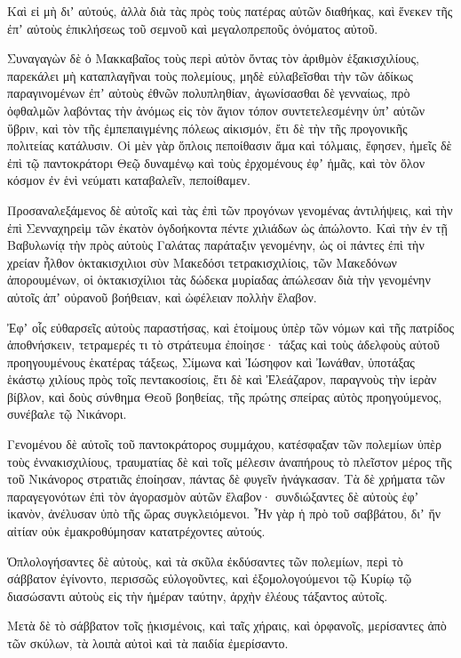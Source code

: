 {Καὶ εἰ μὴ διʼ αὐτούς, ἀλλὰ διὰ τὰς πρὸς τοὺς πατέρας αὐτῶν διαθήκας, καὶ ἕνεκεν τῆς ἐπʼ αὐτοὺς ἐπικλήσεως τοῦ σεμνοῦ καὶ μεγαλοπρεποῦς ὀνόματος αὐτοῦ.
\par }{\PP {}Συναγαγὼν δὲ ὁ Μακκαβαῖος τοὺς περὶ αὐτὸν ὄντας τὸν ἀριθμὸν ἑξακισχιλίους, παρεκάλει μὴ καταπλαγῆναι τοὺς πολεμίους, μηδὲ εὐλαβεῖσθαι τὴν τῶν ἀδίκως παραγινομένων ἐπʼ αὐτοὺς ἐθνῶν πολυπληθίαν, ἀγωνίσασθαι δὲ γενναίως,
πρὸ ὀφθαλμῶν λαβόντας τὴν ἀνόμως εἰς τὸν ἅγιον τόπον συντετελεσμένην ὑπʼ αὐτῶν ὕβριν, καὶ τὸν τῆς ἐμπεπαιγμένης πόλεως αἰκισμόν, ἔτι δὲ τὴν τῆς προγονικῆς πολιτείας κατάλυσιν.
Οἱ μὲν γὰρ ὅπλοις πεποίθασιν ἅμα καὶ τόλμαις, ἔφησεν, ἡμεῖς δὲ ἐπὶ τῷ παντοκράτορι Θεῷ δυναμένῳ καὶ τοὺς ἐρχομένους ἐφʼ ἡμᾶς, καὶ τὸν ὅλον κόσμον ἐν ἑνὶ νεύματι καταβαλεῖν, πεποίθαμεν.
\par }{\PP {}Προσαναλεξάμενος δὲ αὐτοῖς καὶ τὰς ἐπὶ τῶν προγόνων γενομένας ἀντιλήψεις, καὶ τὴν ἐπὶ Σενναχηρεὶμ τῶν ἑκατὸν ὀγδοήκοντα πέντε χιλιάδων ὡς ἀπώλοντο.
Καὶ τὴν ἐν τῇ Βαβυλωνίᾳ τὴν πρὸς αὐτοὺς Γαλάτας παράταξιν γενομένην, ὡς οἱ πάντες ἐπὶ τὴν χρείαν ἦλθον ὀκτακισχιλιοι σὺν Μακεδόσι τετρακισχιλίοις, τῶν Μακεδόνων ἀπορουμένων, οἱ ὀκτακισχίλιοι τὰς δώδεκα μυρίαδας ἀπώλεσαν διὰ τὴν γενομένην αὐτοῖς ἀπʼ οὐρανοῦ βοήθειαν, καὶ ὠφέλειαν πολλὴν ἔλαβον.
\par }{\PP {}Ἐφʼ οἷς εὐθαρσεῖς αὐτοὺς παραστήσας, καὶ ἑτοίμους ὑπὲρ τῶν νόμων καὶ τῆς πατρίδος ἀποθνήσκειν, τετραμερές τι τὸ στράτευμα ἐποίησε·
τάξας καὶ τοὺς ἀδελφοὺς αὐτοῦ προηγουμένους ἑκατέρας τάξεως, Σίμωνα καὶ Ἰώσηφον καὶ Ἰωνάθαν, ὑποτάξας ἑκάστῳ χιλίους πρὸς τοῖς πεντακοσίοις,
ἔτι δὲ καὶ Ἐλεάζαρον, παραγνοὺς τὴν ἱερὰν βίβλον, καὶ δοὺς σύνθημα Θεοῦ βοηθείας, τῆς πρώτης σπείρας αὐτὸς προηγούμενος, συνέβαλε τῷ Νικάνορι.
\par }{\PP {}Γενομένου δὲ αὐτοῖς τοῦ παντοκράτορος συμμάχου, κατέσφαξαν τῶν πολεμίων ὑπὲρ τοὺς ἐννακισχιλίους, τραυματίας δὲ καὶ τοῖς μέλεσιν ἀναπήρους τὸ πλεῖστον μέρος τῆς τοῦ Νικάνορος στρατιᾶς ἐποίησαν, πάντας δὲ φυγεῖν ἠνάγκασαν.
Τὰ δὲ χρήματα τῶν παραγεγονότων ἐπὶ τὸν ἀγορασμὸν αὐτῶν ἔλαβον· συνδιώξαντες δὲ αὐτοὺς ἐφʼ ἱκανὸν, ἀνέλυσαν ὑπὸ τῆς ὥρας συγκλειόμενοι.
Ἦν γὰρ ἡ πρὸ τοῦ σαββάτου, διʼ ἥν αἰτίαν οὐκ ἐμακροθύμησαν κατατρέχοντες αὐτούς.
\par }{\PP {}Ὁπλολογήσαντες δὲ αὐτοὺς, καὶ τὰ σκῦλα ἐκδύσαντες τῶν πολεμίων, περὶ τὸ σάββατον ἐγίνοντο, περισσῶς εὐλογοῦντες, καὶ ἐξομολογούμενοι τῷ Κυρίῳ τῷ διασώσαντι αὐτοὺς εἰς τὴν ἡμέραν ταύτην, ἀρχὴν ἐλέους τάξαντος αὐτοῖς.
\par }{\PP {}Μετὰ δὲ τὸ σάββατον τοῖς ᾐκισμένοις, καὶ ταῖς χήραις, καὶ ὀρφανοῖς, μερίσαντες ἀπὸ τῶν σκύλων, τὰ λοιπὰ αὐτοὶ καὶ τὰ παιδία ἐμερίσαντο.
}
